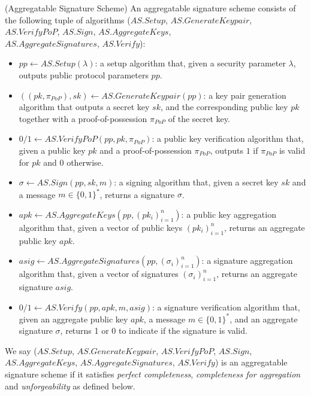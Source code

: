 \begin{definition}
\label{def:aggregate}
(Aggregatable Signature Scheme) An aggregatable signature scheme consists of
the following tuple of algorithms ($\mathit{AS.Setup}$, $\mathit{AS.GenerateKeypair}$, $\mathit{AS.VerifyPoP}$, 
$\mathit{AS.Sign}$, $\mathit{AS.AggregateKeys}$, \\ $\mathit{AS.AggregateSignatures}$, $\mathit{AS.Verify}$):
\begin{itemize}

\item $\mathit{pp} \leftarrow  \mathit{AS.Setup}(\mathit{\lambda})$: a setup algorithm that, given a
security parameter $\lambda$, outputs public protocol parameters $\mathit{pp}$.

\item $((\mathit{pk},\mathit{\pi_{PoP}}),\mathit{sk}) \leftarrow \mathit{AS.GenerateKeypair}(\mathit{pp})$:
a key pair generation algorithm that
outputs
a secret key $\mathit{sk}$,
and the corresponding public key $\mathit{pk}$
together with a proof-of-possession $\mathit{\pi_{PoP}}$ of the secret key.

\item $0/1 \leftarrow \mathit{AS.VerifyPoP}(\mathit{pp}, \mathit{pk},\mathit{\pi_{PoP}})$:
a public key verification algorithm that,
given a public key $\mathit{pk}$
and a proof-of-possession $\mathit{\pi_{PoP}}$,
outputs
$1$ if $\mathit{\pi_{PoP}}$ is valid for $\mathit{pk}$ and $0$ otherwise.

\item $\sigma \leftarrow \mathit{AS.Sign}(\mathit{pp}, \mathit{sk}, m)$:
a signing algorithm that,
given a secret key $\mathit{sk}$ and a message $m \in \{0, 1\}^*$, returns a signature $\sigma$.

\item $\mathit{apk} \leftarrow \mathit{AS.AggregateKeys}(\mathit{pp}, (\mathit{pk_i})_{i=1}^{n})$:
a public key aggregation algorithm that,
given a vector of public keys $(\mathit{pk_i})_{i=1}^n$,
returns
an aggregate public key $\mathit{apk}$.

\item $\mathit{asig} \leftarrow \mathit{AS.AggregateSignatures}(\mathit{pp}, (\sigma_i)_{i=1}^n)$:
a signature aggregation algorithm that,
given a vector of signatures $(\sigma_i)_{i=1}^n$,
returns
an aggregate signature $\mathit{asig}$.

\item $0/1 \leftarrow \mathit{AS.Verify}(\mathit{pp}, \mathit{apk}, m, \mathit{asig})$:
a signature verification algorithm that,
given an aggregate public key $\mathit{apk}$, a message $m \in \{0, 1\}^*$, and an aggregate signature $\sigma$,
returns
1 or 0 to indicate if the signature is valid.
\end{itemize}
\noindent We say ($\mathit{AS.Setup}$, $\mathit{AS.GenerateKeypair}$, $\mathit{AS.VerifyPoP}$, 
$\mathit{AS.Sign}$, \\$\mathit{AS.AggregateKeys}$, $\mathit{AS.AggregateSignatures}$, 
$\mathit{AS.Verify}$) is an aggregatable signature scheme if it satisfies \emph{perfect completeness}, \emph{completeness for aggregation}
and \emph{unforgeability} as defined below.
\end{definition}
